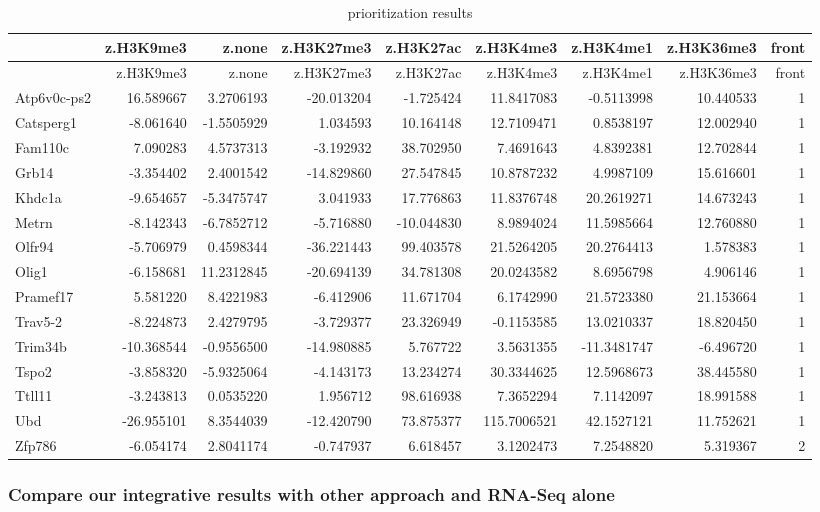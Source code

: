 \documentclass[10pt,]{article}
\begin{document}
\begin{longtable}[]{@{}lrrrrrrrr@{}}
\caption{prioritization results}\tabularnewline
\toprule
& z.H3K9me3 & z.none & z.H3K27me3 & z.H3K27ac & z.H3K4me3 & z.H3K4me1 &
z.H3K36me3 & front\tabularnewline
\midrule
\endfirsthead
\toprule
& z.H3K9me3 & z.none & z.H3K27me3 & z.H3K27ac & z.H3K4me3 & z.H3K4me1 &
z.H3K36me3 & front\tabularnewline
\midrule
\endhead
Atp6v0c-ps2 & 16.589667 & 3.2706193 & -20.013204 & -1.725424 &
11.8417083 & -0.5113998 & 10.440533 & 1\tabularnewline
Catsperg1 & -8.061640 & -1.5505929 & 1.034593 & 10.164148 & 12.7109471 &
0.8538197 & 12.002940 & 1\tabularnewline
Fam110c & 7.090283 & 4.5737313 & -3.192932 & 38.702950 & 7.4691643 &
4.8392381 & 12.702844 & 1\tabularnewline
Grb14 & -3.354402 & 2.4001542 & -14.829860 & 27.547845 & 10.8787232 &
4.9987109 & 15.616601 & 1\tabularnewline
Khdc1a & -9.654657 & -5.3475747 & 3.041933 & 17.776863 & 11.8376748 &
20.2619271 & 14.673243 & 1\tabularnewline
Metrn & -8.142343 & -6.7852712 & -5.716880 & -10.044830 & 8.9894024 &
11.5985664 & 12.760880 & 1\tabularnewline
Olfr94 & -5.706979 & 0.4598344 & -36.221443 & 99.403578 & 21.5264205 &
20.2764413 & 1.578383 & 1\tabularnewline
Olig1 & -6.158681 & 11.2312845 & -20.694139 & 34.781308 & 20.0243582 &
8.6956798 & 4.906146 & 1\tabularnewline
Pramef17 & 5.581220 & 8.4221983 & -6.412906 & 11.671704 & 6.1742990 &
21.5723380 & 21.153664 & 1\tabularnewline
Trav5-2 & -8.224873 & 2.4279795 & -3.729377 & 23.326949 & -0.1153585 &
13.0210337 & 18.820450 & 1\tabularnewline
Trim34b & -10.368544 & -0.9556500 & -14.980885 & 5.767722 & 3.5631355 &
-11.3481747 & -6.496720 & 1\tabularnewline
Tspo2 & -3.858320 & -5.9325064 & -4.143173 & 13.234274 & 30.3344625 &
12.5968673 & 38.445580 & 1\tabularnewline
Ttll11 & -3.243813 & 0.0535220 & 1.956712 & 98.616938 & 7.3652294 &
7.1142097 & 18.991588 & 1\tabularnewline
Ubd & -26.955101 & 8.3544039 & -12.420790 & 73.875377 & 115.7006521 &
42.1527121 & 11.752621 & 1\tabularnewline
Zfp786 & -6.054174 & 2.8041174 & -0.747937 & 6.618457 & 3.1202473 &
7.2548820 & 5.319367 & 2\tabularnewline
\bottomrule
\end{longtable}

\newpage

\hypertarget{compare-our-integrative-results-with-other-approach-and-rna-seq-alone}{%
\subsubsection{Compare our integrative results with other approach and
RNA-Seq
alone}\label{compare-our-integrative-results-with-other-approach-and-rna-seq-alone}}
\end{document}
